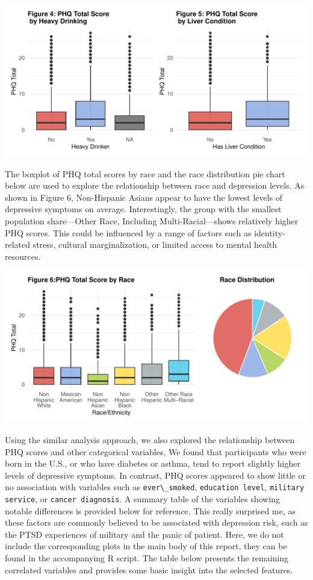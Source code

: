 \documentclass[
  11pt,
]{article}
\newcommand{\passthrough}[1]{#1}
\begin{document}
\includegraphics{report_files/figure-latex/plot_drink_liver-1.pdf}

The boxplot of PHQ total scores by race and the race distribution pie chart below are used to explore the relationship between race and depression levels. As shown in Figure 6, Non-Hispanic Asians appear to have the lowest levels of depressive symptoms on average. Interestingly, the group with the smallest population share---Other Race, Including Multi-Racial---shows relatively higher PHQ scores. This could be influenced by a range of factors such as identity-related stress, cultural marginalization, or limited access to mental health resources.

\includegraphics{report_files/figure-latex/plot_race-1.pdf}

Using the similar analysis approach, we also explored the relationship between PHQ scores and other categorical variables. We found that participants who were born in the U.S., or who have diabetes or asthma, tend to report slightly higher levels of depressive symptoms. In contrast, PHQ scores appeared to show little or no association with variables such as \passthrough{\lstinline!ever\_smoked!}, \passthrough{\lstinline!education level!}, \passthrough{\lstinline!military service!}, or \passthrough{\lstinline!cancer diagnosis!}. A summary table of the variables showing notable differences is provided below for reference. This really surprised me, as these factors are commonly believed to be associated with depression risk, such as the PTSD experiences of military and the panic of patient. Here, we do not include the corresponding plots in the main body of this report, they can be found in the accompanying R script. The table below presents the remaining correlated variables and provides some basic insight into the selected features.
\end{document}
